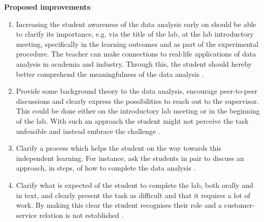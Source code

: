 \documentclass[]{article}
\begin{document}
{\bf Proposed improvements}:
\begin{enumerate}
  \item Increasing the student awareness of the data analysis early on should be able to clarify its importance, e.g. via the title of the lab, at the lab introductory meeting, specifically in the learning outcomes and as part of the experimental procedure.
  The teacher can make connections to real-life applications of data analysis in academia and industry.
  Through this, the student should hereby better comprehend the meaningfulness of the data analysis \cite{saljo}.
\item Provide some background theory to the data analysis, encourage peer-to-peer discussions and clearly express the possibilities to reach out to the supervisor.
This could be done either on the introductory lab meeting or in the beginning of the lab.
With such an approach the student might not perceive the task unfeasible and instead embrace the challenge \cite{saljo, vygotski, daloz}.
  \item Clarify a process which helps the student on the way towards this independent learning.
    For instance, ask the students in pair to discuss an approach, in steps, of how to complete the data analysis \cite{saljo,vygotski}.
  \item Clarify what is expected of the student to complete the lab, both orally and in text, and clearly present the task as difficult and that it requires a lot of work.
    By making this clear the student recognises their role and a customer-service relation is not established \cite{kund}.
\end{enumerate}

\tiny
%



\end{document}
